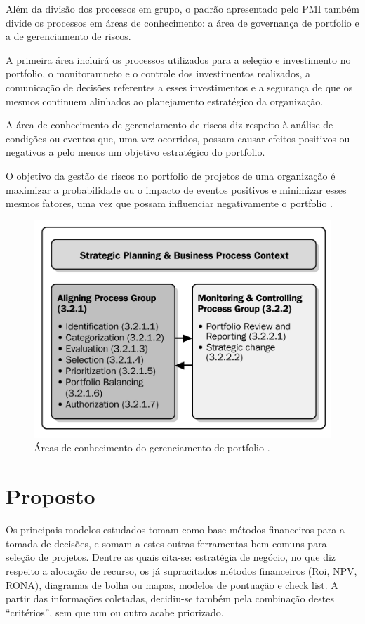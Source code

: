 \documentclass[12pt,a4paper,ruledheader,tocpage=prefix,floatnumber=continuous,pagestart=folhaderosto,font=times]{abnt}
\begin{document}
Além da divisão dos processos em grupo, o padrão apresentado pelo PMI também divide os processos em áreas de conhecimento: a área de governança de 
portfolio e a de gerenciamento de riscos.

A primeira área incluirá os processos utilizados para a seleção e investimento no portfolio, o monitoramneto e o controle dos investimentos realizados, 
a comunicação de decisões referentes a esses investimentos e a segurança de que os mesmos continuem alinhados ao planejamento estratégico da organização.

A área de conhecimento de gerenciamento de riscos diz respeito à análise de condições ou eventos que, uma vez ocorridos, possam causar efeitos positivos 
ou negativos a pelo menos um objetivo estratégico do portfolio. 

O objetivo da gestão de riscos no portfolio de projetos de uma organização é maximizar a probabilidade ou o impacto de eventos positivos e minimizar 
esses mesmos fatores, uma vez que possam influenciar negativamente o portfolio \cite{sppm}.

\begin{figure}[H]
\centering
\includegraphics[width=.9\textwidth]{areas_conhecimento_pmi.png}
\caption{Áreas de conhecimento do gerenciamento de portfolio \cite{sppm}.}
\end{figure}

\section{Proposto}
Os principais modelos estudados tomam como base métodos financeiros para a tomada de decisões, e somam a estes outras ferramentas bem comuns para seleção 
de projetos. Dentre as quais cita-se: estratégia de negócio, no que diz respeito a alocação de recurso, os já supracitados métodos financeiros (Roi, NPV,
RONA), diagramas de bolha ou mapas, modelos de pontuação e check list. A partir das informações coletadas, decidiu-se também pela combinação destes 
``critérios'', sem que um ou outro acabe priorizado.
\end{document}
